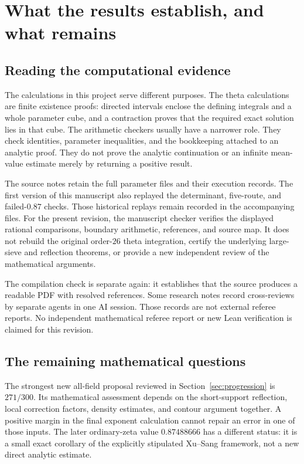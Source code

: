 \section{What the results establish, and what remains}\label{sec:verification}

\subsection{Reading the computational evidence}
The calculations in this project serve different purposes. The theta calculations are finite existence proofs: directed intervals enclose the defining integrals and a whole parameter cube, and a contraction proves that the required exact solution lies in that cube. The arithmetic checkers usually have a narrower role. They check identities, parameter inequalities, and the bookkeeping attached to an analytic proof. They do not prove the analytic continuation or an infinite mean-value estimate merely by returning a positive result.

The source notes retain the full parameter files and their execution records. The first version of this manuscript also replayed the determinant, five-route, and failed-$0.87$ checks. Those historical replays remain recorded in the accompanying files. For the present revision, the manuscript checker verifies the displayed rational comparisons, boundary arithmetic, references, and source map. It does not rebuild the original order-$26$ theta integration, certify the underlying large-sieve and reflection theorems, or provide a new independent review of the mathematical arguments.

The compilation check is separate again: it establishes that the source produces a readable PDF with resolved references. Some research notes record cross-reviews by separate agents in one AI session. Those records are not external referee reports. No independent mathematical referee report or new Lean verification is claimed for this revision.

\subsection{The remaining mathematical questions}
The strongest new all-field proposal reviewed in Section~\ref{sec:progression} is $271/300$. Its mathematical assessment depends on the short-support reflection, local correction factors, density estimates, and contour argument together. A positive margin in the final exponent calculation cannot repair an error in one of those inputs. The later ordinary-zeta value $0.87488666$ has a different status: it is a small exact corollary of the explicitly stipulated Xu--Sang framework, not a new direct analytic estimate.

